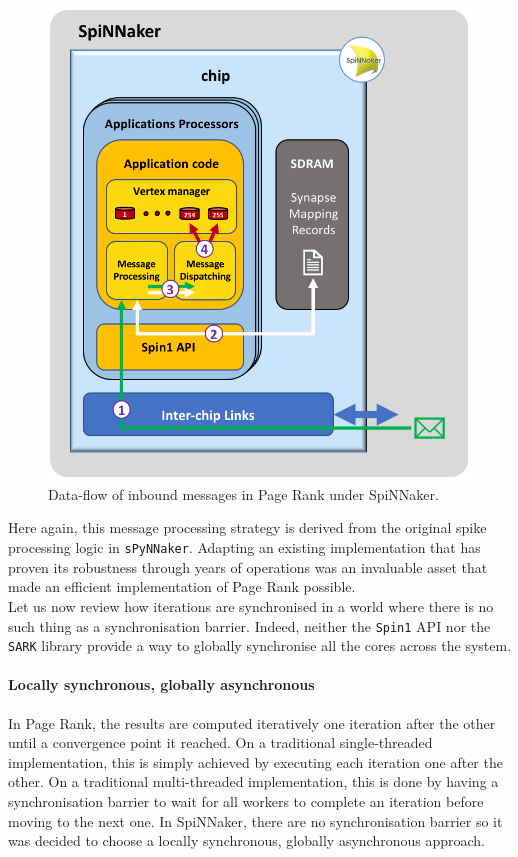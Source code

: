 \begin{figure}[hbtp]
\centering 
\includegraphics[width=0.9\hsize]{figures/impl-dataflow-in.png}
\caption{Data-flow of inbound messages in Page Rank under SpiNNaker.}
\label{fig:dataflow-in}
\end{figure}

Here again, this message processing strategy is derived from the original spike processing logic in \texttt{sPyNNaker}. Adapting an existing implementation that has proven its robustness through years of operations was an invaluable asset that made an efficient implementation of Page Rank possible. \\ 

Let us now review how iterations are synchronised in a world where there is no such thing as a synchronisation barrier. Indeed, neither the \texttt{Spin1} API nor the \texttt{SARK} library provide a way to globally synchronise all the cores across the system.

\paragraph{Locally synchronous, globally asynchronous}

In Page Rank, the results are computed iteratively one iteration after the other until a convergence point it reached. On a traditional single-threaded implementation, this is simply achieved by executing each iteration one after the other. On a traditional multi-threaded implementation, this is done by having a synchronisation barrier to wait for all workers to complete an iteration before moving to the next one. In SpiNNaker, there are no synchronisation barrier so it was decided to choose a locally synchronous, globally asynchronous approach. \\


